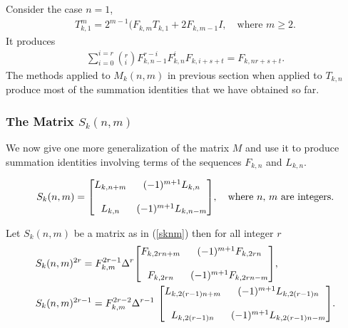 Consider the case $n=1$,
\begin{align}
	T_{k,1}^m=2^{m-1}(F_{k,m}T_{k,1}+2F_{k,m-1}I, \quad \text{where $m\geq 2$.}
	\end{align}
It produces
\begin{align}
	\sum_{i=0}^{i=r}\left(^{r} _{i} \right)F_{k,n-1}^{r-i}F_{k,n}^iF_{k,i+s+t}	=F_{k,nr+s+t}.	
\end{align}
The methods applied to $M_{k}(n,m)$ in previous section when applied to $T_{k,n}$ produce most of the summation identities that we have obtained so far.
\subsubsection{{The Matrix $S_{k}(n,m)$} }
We now give one more generalization of the matrix $M$ and use it to produce summation identities involving terms of the sequences $F_{k,n}$ and $L_{k,n}$. 
\begin{definition}
\begin{align}\label{sknm}
 S_{k}(n,m) = {\begin{bmatrix}
            L_{k,n+m} & (-1)^{m+1}L_{k,n} \bigskip\\
            L_{k,n} & (-1)^{m+1}L_{k,n-m} 
          \end{bmatrix}
        }, \quad \text{where  $n$, $m$ are integers.}
\end{align}
\end{definition}
\begin{theorem} Let $S_{k}(n,m)$ be a matrix as in (\ref{sknm}) then for all integer $r$ 
\begin{align*}
 &S_{k}(n,m)^{2r}= F_{k,m}^{2r-1}\Delta^r{
          \begin{bmatrix}
            F_{k,2rn+m} & (-1)^{m+1}F_{k,2rn}\bigskip \\
            F_{k,2rn} & (-1)^{m+1}F_{k,2rn-m} 
          \end{bmatrix}
      },\\&S_{k}(n,m)^{2r-1}= F_{k,m}^{2r-2}\Delta^{r-1}{\
          \begin{bmatrix}
            L_{k,2(r-1)n+m} & (-1)^{m+1}L_{k,2(r-1)n} \bigskip\\
            L_{k,2(r-1)n} & (-1)^{m+1}L_{k,2(r-1)n-m} 
          \end{bmatrix}
      }.
    \end{align*}    
\end{theorem}
